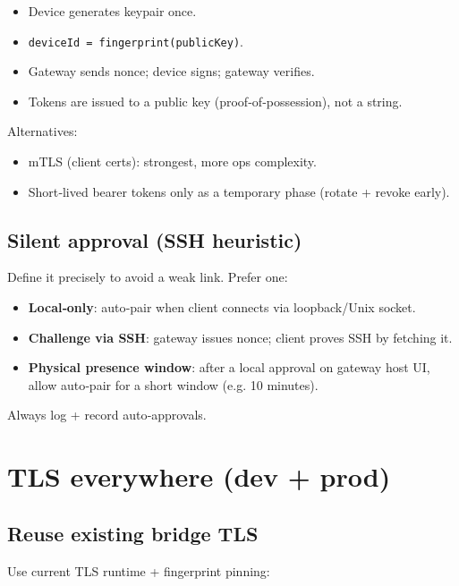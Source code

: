 \begin{itemize}
  \item Device generates keypair once.
  \item \texttt{deviceId = fingerprint(publicKey)}.
  \item Gateway sends nonce; device signs; gateway verifies.
  \item Tokens are issued to a public key (proof‑of‑possession), not a string.
\end{itemize}


Alternatives:

\begin{itemize}
  \item mTLS (client certs): strongest, more ops complexity.
  \item Short‑lived bearer tokens only as a temporary phase (rotate + revoke early).
\end{itemize}


\subsection{Silent approval (SSH heuristic)}


Define it precisely to avoid a weak link. Prefer one:

\begin{itemize}
  \item \textbf{Local‑only}: auto‑pair when client connects via loopback/Unix socket.
  \item \textbf{Challenge via SSH}: gateway issues nonce; client proves SSH by fetching it.
  \item \textbf{Physical presence window}: after a local approval on gateway host UI, allow auto‑pair for a short window (e.g. 10 minutes).
\end{itemize}


Always log + record auto‑approvals.

\hrulefill


\section{TLS everywhere (dev + prod)}


\subsection{Reuse existing bridge TLS}


Use current TLS runtime + fingerprint pinning:


